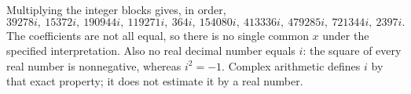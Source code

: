 Multiplying the integer blocks gives, in order,
\[
39278i,\ 15372i,\ 190944i,\ 119271i,\ 364i,\
154080i,\ 413336i,\ 479285i,\ 721344i,\ 2397i.
\]
The coefficients are not all equal, so there is no single common $x$ under the specified interpretation. Also no real decimal number equals $i$: the square of every real number is nonnegative, whereas $i^2=-1$. Complex arithmetic defines $i$ by that exact property; it does not estimate it by a real number.
